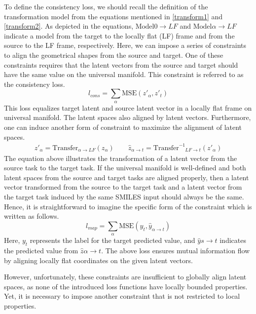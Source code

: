 To define the consistency loss, we should recall the definition of the transformation model from the equations mentioned in \ref{transform1} and \ref{transform2}. As depicted in the equations, $\mathrm{Model}{0 \rightarrow LF}$ and $\mathrm{Model}{\alpha \rightarrow LF}$ indicate a model from the target to the locally flat (LF) frame and from the source to the LF frame, respectively. Here, we can impose a series of constraints to align the geometrical shapes from the source and target. One of these constraints requires that the latent vectors from the source and target should have the same value on the universal manifold. This constraint is referred to as the consistency loss.
\begin{equation}
    l_{cons} = \sum_\alpha \mathrm{MSE}(z'_\alpha, z'_t)
\end{equation}
This loss equalizes target latent and source latent vector in a locally flat frame on universal manifold. The latent spaces also aligned by latent vectors. Furthermore, one can induce another form of constraint to maximize the alignment of latent spaces.
\begin{gather}
    z'_\alpha = \mathrm{Transfer}_{\alpha\rightarrow LF}(z_\alpha) \qquad    \hat{z}_{\alpha \rightarrow t} = \mathrm{Transfer}^{-1}_{\phantom{-1}LF \rightarrow t}(z'_\alpha)
\end{gather}
The equation above illustrates the transformation of a latent vector from the source task to the target task. If the universal manifold is well-defined and both latent spaces from the source and target tasks are aligned properly, then a latent vector transformed from the source to the target task and a latent vector from the target task induced by the same SMILES input should always be the same. Hence, it is straightforward to imagine the specific form of the constraint which is written as follows.
\begin{equation}
    l_{map} = \sum_\alpha \mathrm{MSE}(y_t, \hat{y}_{\alpha \rightarrow t})
\end{equation}
Here, $y_t$ represents the label for the target predicted value, and $\hat{y}{s \rightarrow t}$ indicates the predicted value from $\hat{z}{\alpha \rightarrow t}$. The above loss ensures mutual information flow by aligning locally flat coordinates on the given latent vectors.

However, unfortunately, these constraints are insufficient to globally align latent spaces, as none of the introduced loss functions have locally bounded properties. Yet, it is necessary to impose another constraint that is not restricted to local properties.

